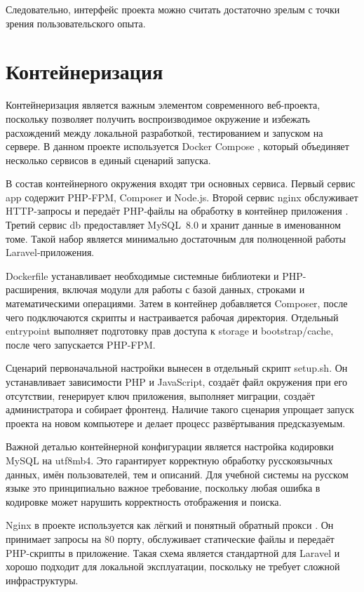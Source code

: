 \documentclass[14pt,a4paper]{extreport}
\begin{document}
Следовательно, интерфейс проекта можно считать достаточно зрелым с точки
зрения пользовательского опыта.

\section{Контейнеризация}

Контейнеризация является важным элементом современного веб-проекта,
поскольку позволяет получить воспроизводимое окружение и избежать
расхождений между локальной разработкой, тестированием и запуском на сервере.
В данном проекте используется Docker Compose \cite{dockerdoc}, который
объединяет несколько сервисов в единый сценарий запуска.

В состав контейнерного окружения входят три основных сервиса.
Первый сервис app содержит PHP-FPM, Composer и Node.js.
Второй сервис nginx обслуживает HTTP-запросы и передаёт PHP-файлы на
обработку в контейнер приложения \cite{nginxdoc}.
Третий сервис db предоставляет MySQL~8.0 и хранит данные в именованном томе.
Такой набор является минимально достаточным для полноценной работы
Laravel-приложения.

Dockerfile устанавливает необходимые системные библиотеки и PHP-расширения,
включая модули для работы с базой данных, строками и математическими
операциями.
Затем в контейнер добавляется Composer, после чего подключаются скрипты и
настраивается рабочая директория.
Отдельный entrypoint выполняет подготовку прав доступа к storage и
bootstrap/cache, после чего запускается PHP-FPM.

Сценарий первоначальной настройки вынесен в отдельный скрипт setup.sh.
Он устанавливает зависимости PHP и JavaScript, создаёт файл окружения при
его отсутствии, генерирует ключ приложения, выполняет миграции, создаёт
администратора и собирает фронтенд.
Наличие такого сценария упрощает запуск проекта на новом компьютере и
делает процесс развёртывания предсказуемым.

Важной деталью контейнерной конфигурации является настройка кодировки
MySQL на utf8mb4.
Это гарантирует корректную обработку русскоязычных данных, имён пользователей,
тем и описаний.
Для учебной системы на русском языке это принципиально важное требование,
поскольку любая ошибка в кодировке может нарушить корректность отображения
и поиска.

Nginx в проекте используется как лёгкий и понятный обратный прокси
\cite{nginxdoc}.
Он принимает запросы на 80 порту, обслуживает статические файлы и передаёт
PHP-скрипты в приложение.
Такая схема является стандартной для Laravel и хорошо подходит для локальной
эксплуатации, поскольку не требует сложной инфраструктуры.
\end{document}
